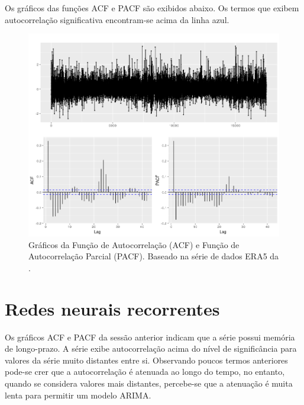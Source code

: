 \documentclass[
	12pt,				%
	openright,			%
	oneside,			%
	a4paper,			%
	english,			%
	french,				%
	spanish,			%
	brazil				%
	]{abntex2}
\begin{document}
Os gráficos das funções ACF e PACF são exibidos abaixo. Os termos que exibem autocorrelação significativa encontram-se acima da linha azul.

\begin{figure}[h]
    \centering
	\includegraphics[width=\textwidth]{long_memory.png}
	\caption{Gráficos da Função de Autocorrelação (ACF) e Função de Autocorrelação Parcial (PACF). Baseado na série de dados ERA5 da \cite{era5}.}
\end{figure}
\FloatBarrier 

\section{Redes neurais recorrentes}

Os gráficos ACF e PACF da sessão anterior indicam que a série possui memória de longo-prazo. A série exibe autocorrelação acima do nível de significância para valores da série muito distantes entre si. Observando poucos termos anteriores pode-se crer que a autocorrelação é atenuada ao longo do tempo, no entanto, quando se considera valores mais distantes, percebe-se que a atenuação é muita lenta para permitir um modelo ARIMA.
\end{document}
